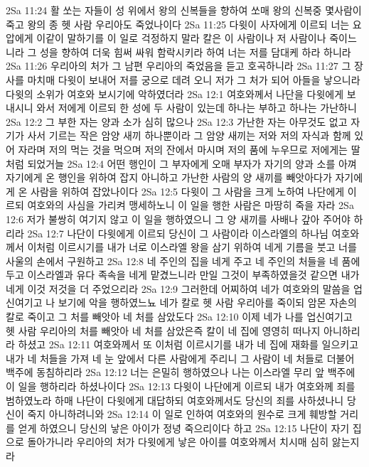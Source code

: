 2Sa 11:24  활 쏘는 자들이 성 위에서 왕의 신복들을 향하여 쏘매 왕의 신복중 몇사람이 죽고 왕의 종 헷 사람 우리아도 죽었나이다
2Sa 11:25  다윗이 사자에게 이르되 너는 요압에게 이같이 말하기를 이 일로 걱정하지 말라 칼은 이 사람이나 저 사람이나 죽이느니라 그 성을 향하여 더욱 힘써 싸워 함락시키라 하여 너는 저를 담대케 하라 하니라
2Sa 11:26  우리아의 처가 그 남편 우리아의 죽었음을 듣고 호곡하니라
2Sa 11:27  그 장사를 마치매 다윗이 보내어 저를 궁으로 데려 오니 저가 그 처가 되어 아들을 낳으니라 다윗의 소위가 여호와 보시기에 악하였더라
2Sa 12:1  여호와께서 나단을 다윗에게 보내시니 와서 저에게 이르되 한 성에 두 사람이 있는데 하나는 부하고 하나는 가난하니
2Sa 12:2  그 부한 자는 양과 소가 심히 많으나
2Sa 12:3  가난한 자는 아무것도 없고 자기가 사서 기르는 작은 암양 새끼 하나뿐이라 그 암양 새끼는 저와 저의 자식과 함께 있어 자라며 저의 먹는 것을 먹으며 저의 잔에서 마시며 저의 품에 누우므로 저에게는 딸처럼 되었거늘
2Sa 12:4  어떤 행인이 그 부자에게 오매 부자가 자기의 양과 소를 아껴 자기에게 온 행인을 위하여 잡지 아니하고 가난한 사람의 양 새끼를 빼앗아다가 자기에게 온 사람을 위하여 잡았나이다
2Sa 12:5  다윗이 그 사람을 크게 노하여 나단에게 이르되 여호와의 사심을 가리켜 맹세하노니 이 일을 행한 사람은 마땅히 죽을 자라
2Sa 12:6  저가 불쌍히 여기지 않고 이 일을 행하였으니 그 양 새끼를 사배나 갚아 주어야 하리라
2Sa 12:7  나단이 다윗에게 이르되 당신이 그 사람이라 이스라엘의 하나님 여호와께서 이처럼 이르시기를 내가 너로 이스라엘 왕을 삼기 위하여 네게 기름을 붓고 너를 사울의 손에서 구원하고
2Sa 12:8  네 주인의 집을 네게 주고 네 주인의 처들을 네 품에 두고 이스라엘과 유다 족속을 네게 맡겼느니라 만일 그것이 부족하였을것 같으면 내가 네게 이것 저것을 더 주었으리라
2Sa 12:9  그러한데 어찌하여 네가 여호와의 말씀을 업신여기고 나 보기에 악을 행하였느뇨 네가 칼로 헷 사람 우리아를 죽이되 암몬 자손의 칼로 죽이고 그 처를 빼앗아 네 처를 삼았도다
2Sa 12:10  이제 네가 나를 업신여기고 헷 사람 우리아의 처를 빼앗아 네 처를 삼았은즉 칼이 네 집에 영영히 떠나지 아니하리라 하셨고
2Sa 12:11  여호와께서 또 이처럼 이르시기를 내가 네 집에 재화를 일으키고 내가 네 처들을 가져 네 눈 앞에서 다른 사람에게 주리니 그 사람이 네 처들로 더불어 백주에 동침하리라
2Sa 12:12  너는 은밀히 행하였으나 나는 이스라엘 무리 앞 백주에 이 일을 행하리라 하셨나이다
2Sa 12:13  다윗이 나단에게 이르되 내가 여호와께 죄를 범하였노라 하매 나단이 다윗에게 대답하되 여호와께서도 당신의 죄를 사하셨나니 당신이 죽지 아니하려니와
2Sa 12:14  이 일로 인하여 여호와의 원수로 크게 훼방할 거리를 얻게 하였으니 당신의 낳은 아이가 정녕 죽으리이다 하고
2Sa 12:15  나단이 자기 집으로 돌아가니라 우리아의 처가 다윗에게 낳은 아이를 여호와께서 치시매 심히 앓는지라
